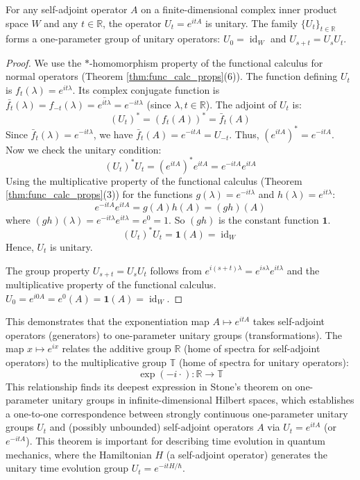 \begin{proposition}
For any self-adjoint operator $A$ on a finite-dimensional complex inner product space $W$ and any $t \in \mathbb{R}$, the operator $U_t = e^{itA}$ is unitary. The family $\{U_t\}_{t \in \mathbb{R}}$ forms a one-parameter group of unitary operators: $U_0 = \operatorname{id}_W$ and $U_{s+t} = U_s U_t$.
\end{proposition}
\begin{proof}
We use the $\ast$-homomorphism property of the functional calculus for normal operators (Theorem \ref{thm:func_calc_props}(6)). The function defining $U_t$ is $f_t(\lambda)=e^{it\lambda}$. Its complex conjugate function is $\bar{f_t}(\lambda) = f_{-t}(\lambda) = \overline{e^{it\lambda}} = e^{-it\lambda}$ (since $\lambda, t \in \mathbb{R}$).
The adjoint of $U_t$ is:
\[ (U_t)^* = (f_t(A))^* = \bar{f}_t(A) \]
Since $\bar{f}_t(\lambda) = e^{-it\lambda}$, we have $\bar{f}_t(A) = e^{-itA} = U_{-t}$.
Thus, $(e^{itA})^* = e^{-itA}$.
Now we check the unitary condition:
\[ (U_t)^* U_t = (e^{itA})^* e^{itA} = e^{-itA} e^{itA} \]
Using the multiplicative property of the functional calculus (Theorem \ref{thm:func_calc_props}(3)) for the functions $g(\lambda)=e^{-it\lambda}$ and $h(\lambda)=e^{it\lambda}$:
\[ e^{-itA} e^{itA} = g(A)h(A) = (gh)(A) \]
where $(gh)(\lambda) = e^{-it\lambda}e^{it\lambda} = e^0 = 1$. So $(gh)$ is the constant function $\mathbf{1}$.
\[ (U_t)^* U_t = \mathbf{1}(A) = \operatorname{id}_W \]
Hence, $U_t$ is unitary.

The group property $U_{s+t} = U_s U_t$ follows from $e^{i(s+t)\lambda} = e^{is\lambda}e^{it\lambda}$ and the multiplicative property of the functional calculus. $U_0 = e^{i0A} = e^0(A) = \mathbf{1}(A) = \operatorname{id}_W$.
\end{proof}

This demonstrates that the exponentiation map $A \mapsto e^{itA}$ takes self-adjoint operators (generators) to one-parameter unitary groups (transformations). The map $x \mapsto e^{ix}$ relates the additive group $\mathbb{R}$ (home of spectra for self-adjoint operators) to the multiplicative group $\mathbb{T}$ (home of spectra for unitary operators):
\begin{equation} \label{eq:4.20}
\exp(-i \cdot): \mathbb{R} \longrightarrow \mathbb{T}
\end{equation}
This relationship finds its deepest expression in Stone's theorem on one-parameter unitary groups in infinite-dimensional Hilbert spaces, which establishes a one-to-one correspondence between strongly continuous one-parameter unitary groups $U_t$ and (possibly unbounded) self-adjoint operators $A$ via $U_t = e^{itA}$ (or $e^{-itA}$). This theorem is important for describing time evolution in quantum mechanics, where the Hamiltonian $H$ (a self-adjoint operator) generates the unitary time evolution group $U_t = e^{-itH/\hbar}$.

